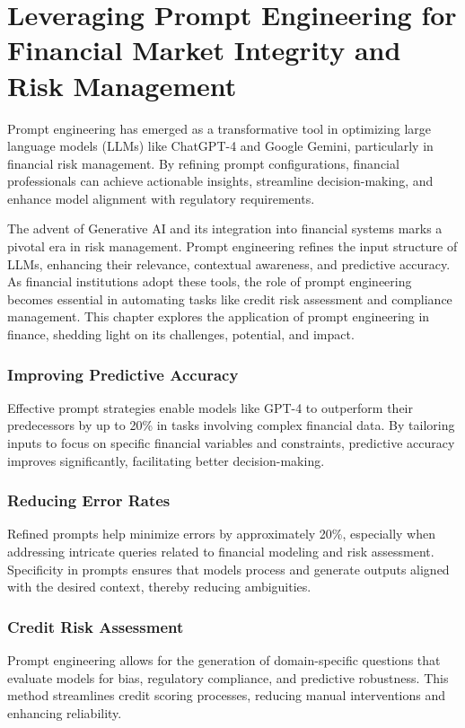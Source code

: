 \documentclass[a4paper,headinclude=on,footinclude=on,12pt,oneside]{scrbook}
\begin{document}
	\chapter{Leveraging Prompt Engineering for Financial Market Integrity and Risk Management}
	
	Prompt engineering has emerged as a transformative tool in optimizing large language models (LLMs) like ChatGPT-4 and Google Gemini, particularly in financial risk management. By refining prompt configurations, financial professionals can achieve actionable insights, streamline decision-making, and enhance model alignment with regulatory requirements.
	
	The advent of Generative AI and its integration into financial systems marks a pivotal era in risk management. Prompt engineering refines the input structure of LLMs, enhancing their relevance, contextual awareness, and predictive accuracy. As financial institutions adopt these tools, the role of prompt engineering becomes essential in automating tasks like credit risk assessment and compliance management. This chapter explores the application of prompt engineering in finance, shedding light on its challenges, potential, and impact.
	
	
	\subsection{Improving Predictive Accuracy}
	Effective prompt strategies enable models like GPT-4 to outperform their predecessors by up to 20\% in tasks involving complex financial data. By tailoring inputs to focus on specific financial variables and constraints, predictive accuracy improves significantly, facilitating better decision-making.
	
	\subsection{Reducing Error Rates}
	Refined prompts help minimize errors by approximately 20\%, especially when addressing intricate queries related to financial modeling and risk assessment. Specificity in prompts ensures that models process and generate outputs aligned with the desired context, thereby reducing ambiguities.
	
	
	\subsection{Credit Risk Assessment}
	Prompt engineering allows for the generation of domain-specific questions that evaluate models for bias, regulatory compliance, and predictive robustness. This method streamlines credit scoring processes, reducing manual interventions and enhancing reliability.
	
\end{document}
